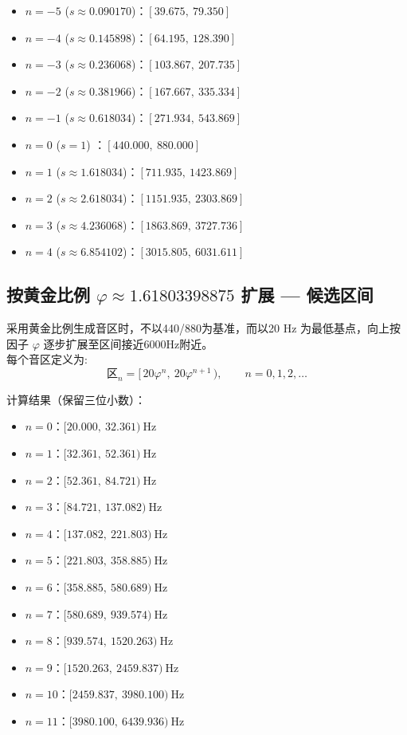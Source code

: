 \documentclass{article}
\begin{document}
\begin{itemize}
  \item $n=-5$ ($s\approx0.090170$)：$[39.675,\ 79.350]$
  \item $n=-4$ ($s\approx0.145898$)：$[64.195,\ 128.390]$
  \item $n=-3$ ($s\approx0.236068$)：$[103.867,\ 207.735]$
  \item $n=-2$ ($s\approx0.381966$)：$[167.667,\ 335.334]$
  \item $n=-1$ ($s\approx0.618034$)：$[271.934,\ 543.869]$
  \item $n=0$  ($s=1$)          ：$[440.000,\ 880.000]$
  \item $n=1$  ($s\approx1.618034$)：$[711.935,\ 1423.869]$
  \item $n=2$  ($s\approx2.618034$)：$[1151.935,\ 2303.869]$
  \item $n=3$  ($s\approx4.236068$)：$[1863.869,\ 3727.736]$
  \item $n=4$  ($s\approx6.854102$)：$[3015.805,\ 6031.611]$
\end{itemize}

\subsection{按黄金比例 \(\varphi\approx1.61803398875\) 扩展 — 候选区间}
采用黄金比例生成音区时，不以440/880为基准，而以20 Hz 为最低基点，向上按因子 \(\varphi\) 逐步扩展至区间接近6000Hz附近。
\\每个音区定义为:
\[
\text{区}_n = \big[\,20\varphi^{n},\ 20\varphi^{n+1}\,\big),\qquad n=0,1,2,\dots
\]

计算结果（保留三位小数）：
\begin{itemize}
  \item $n=0$：$[20.000,\ 32.361)\ \mathrm{Hz}$
  \item $n=1$：$[32.361,\ 52.361)\ \mathrm{Hz}$
  \item $n=2$：$[52.361,\ 84.721)\ \mathrm{Hz}$
  \item $n=3$：$[84.721,\ 137.082)\ \mathrm{Hz}$
  \item $n=4$：$[137.082,\ 221.803)\ \mathrm{Hz}$
  \item $n=5$：$[221.803,\ 358.885)\ \mathrm{Hz}$
  \item $n=6$：$[358.885,\ 580.689)\ \mathrm{Hz}$
  \item $n=7$：$[580.689,\ 939.574)\ \mathrm{Hz}$
  \item $n=8$：$[939.574,\ 1520.263)\ \mathrm{Hz}$
  \item $n=9$：$[1520.263,\ 2459.837)\ \mathrm{Hz}$
  \item $n=10$：$[2459.837,\ 3980.100)\ \mathrm{Hz}$
  \item $n=11$：$[3980.100,\ 6439.936)\ \mathrm{Hz}$
\end{itemize}
\end{document}
